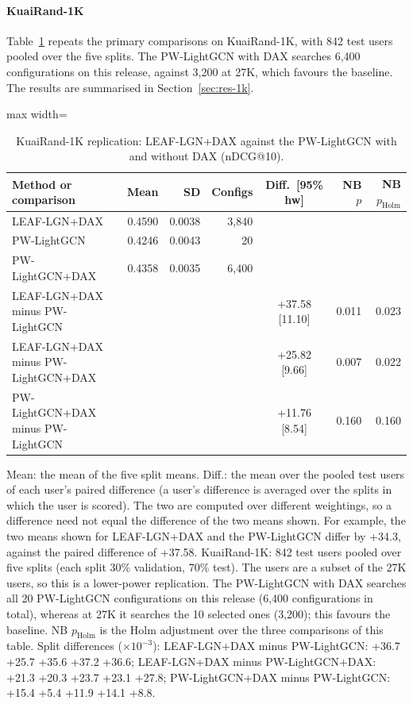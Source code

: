 \documentclass[preprint,12pt,authoryear]{elsarticle}
\begin{document}
\paragraph{KuaiRand-1K} Table~\ref{tab:1k} repeats the primary comparisons on KuaiRand-1K, with 842 test users pooled over the five splits. The
PW-LightGCN with DAX searches 6,400 configurations on this release, against 3,200 at 27K, which favours the baseline. The results are summarised in
Section~\ref{sec:res-1k}.

\begin{table}[tbp]
\centering
\footnotesize
\caption{KuaiRand-1K replication: LEAF-LGN+DAX against the PW-LightGCN with and without DAX (nDCG@10).}
\label{tab:1k}
\begin{adjustbox}{max width=\linewidth}
\begin{tabular}{lrrrcrr}
\toprule
Method or comparison & Mean & SD & Configs & Diff.\ [95\% hw] & NB $p$ & NB $p_{\mathrm{Holm}}$ \\
\midrule
LEAF-LGN+DAX & 0.4590 & 0.0038 & 3,840 &  &  &  \\
PW-LightGCN & 0.4246 & 0.0043 & 20 &  &  &  \\
PW-LightGCN+DAX & 0.4358 & 0.0035 & 6,400 &  &  &  \\
\midrule
LEAF-LGN+DAX minus PW-LightGCN &  &  &  & +37.58 [11.10] & 0.011 & 0.023 \\
LEAF-LGN+DAX minus PW-LightGCN+DAX &  &  &  & +25.82 [9.66] & 0.007 & 0.022 \\
PW-LightGCN+DAX minus PW-LightGCN &  &  &  & +11.76 [8.54] & 0.160 & 0.160 \\
\bottomrule
\end{tabular}
\end{adjustbox}
\par\smallskip
\begin{minipage}{\linewidth}\raggedright\footnotesize Mean: the mean of the five split means. Diff.: the mean over the pooled test users of each user's paired difference (a user's difference is averaged over the splits in which the user is scored). The two are computed over different weightings, so a difference need not equal the difference of the two means shown. For example, the two means shown for LEAF-LGN+DAX and the PW-LightGCN differ by +34.3, against the paired difference of +37.58. KuaiRand-1K: 842 test users pooled over five splits (each split 30\% validation, 70\% test). The users are a subset of the 27K users, so this is a lower-power replication. The PW-LightGCN with DAX searches all 20 PW-LightGCN configurations on this release (6,400 configurations in total), whereas at 27K it searches the 10 selected ones (3,200); this favours the baseline. NB $p_{\mathrm{Holm}}$ is the Holm adjustment over the three comparisons of this table. Split differences ($\times10^{-3}$): LEAF-LGN+DAX minus PW-LightGCN: +36.7 +25.7 +35.6 +37.2 +36.6; LEAF-LGN+DAX minus PW-LightGCN+DAX: +21.3 +20.3 +23.7 +23.1 +27.8; PW-LightGCN+DAX minus PW-LightGCN: +15.4 +5.4 +11.9 +14.1 +8.8.\end{minipage}
\end{table}
\end{document}
